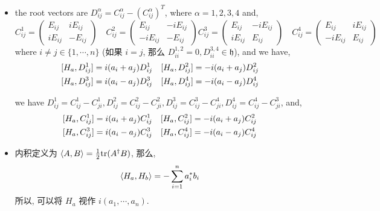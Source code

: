 \begin{itemize}
	\item the root vectors are $D^\alpha_{i j} = C^\alpha_{i j} - (C^{\alpha}_{i j})^T$, where $\alpha = 1, 2, 3, 4$ and,
	\begin{equation}
		C^1_{i j} = \begin{pmatrix}
			E_{i j} & i E_{i j} \\
			i E_{i j} & - E_{i j}
		\end{pmatrix} \quad C^2_{i j} = \begin{pmatrix}
			E_{i j} & - i E_{i j} \\
			- i E_{i j} & - E_{i j}
		\end{pmatrix} C^3_{i j} = \begin{pmatrix}
			E_{i j} & - i E_{i j} \\
			i E_{i j} & E_{i j}
		\end{pmatrix} \quad C^4_{i j} = \begin{pmatrix}
			E_{i j} & i E_{i j} \\
			- i E_{i j} & E_{i j}
		\end{pmatrix}
	\end{equation}
	where $i \neq j \in \{1, \cdots, n\}$ (如果 $i = j$, 那么 $D^{1, 2}_{i i} = 0, D^{3, 4}_{i i} \in \mathfrak{h}$), and we have,
	\begin{align}
		& [H_a, D^1_{i j}] = i (a_i + a_j) D^1_{i j} \quad [H_a, D^2_{i j}] = - i (a_i + a_j) D^2_{i j} \notag \\
		& [H_a, D^3_{i j}] = i (a_i - a_j) D^3_{i j} \quad [H_a, D^4_{i j}] = - i (a_i - a_j) D^4_{i j}
	\end{align}
	
	\begin{tcolorbox}[title=calculation:]
		we have $D^1_{i j} = C^1_{i j} - C^1_{j i}, D^2_{i j} = C^2_{i j} - C^2_{j i}, D^3_{i j} = C^3_{i j} - C^4_{j i}, D^4_{i j} = C^4_{i j} - C^3_{j i}$, and,
		\begin{align}
			& [H_a, C^1_{i j}] = i (a_i + a_j) C^1_{i j} \quad [H_a, C^2_{i j}] = - i (a_i + a_j) C^2_{i j} \notag \\
			& [H_a, C^3_{i j}] = i (a_i - a_j) C^3_{i j} \quad [H_a, C^4_{i j}] = - i (a_i - a_j) C^4_{i j}
		\end{align}
	\end{tcolorbox}
	
	\item 内积定义为 $\braket{A, B} = \frac{1}{2} \mathrm{tr}(A^\dag B)$, 那么,
	\begin{equation}
		\braket{H_a, H_b} = - \sum_{i = 1}^n a_i^* b_i
	\end{equation}
	所以, 可以将 $H_a$ 视作 $i (a_1, \cdots, a_n)$.
	

\end{itemize}
